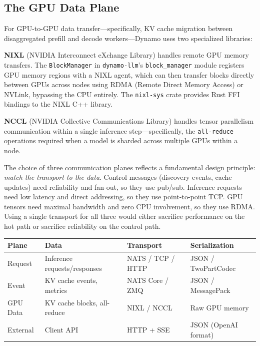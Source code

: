 \subsection{The GPU Data Plane}

For GPU-to-GPU data transfer---specifically, KV cache migration between disaggregated prefill and decode workers---Dynamo uses two specialized libraries:

%
\textbf{NIXL} (NVIDIA Interconnect eXchange Library) handles remote GPU memory transfers. The \texttt{BlockManager} in \texttt{dynamo-llm}'s \texttt{block\_manager} module registers GPU memory regions with a NIXL agent, which can then transfer blocks directly between GPUs across nodes using RDMA (Remote Direct Memory Access) or NVLink, bypassing the CPU entirely. The \texttt{nixl-sys} crate provides Rust FFI bindings to the NIXL C++ library.

\textbf{NCCL} (NVIDIA Collective Communications Library) handles tensor parallelism communication within a single inference step---specifically, the \texttt{all-reduce} operations required when a model is sharded across multiple GPUs within a node.

\begin{insightbox}
The choice of three communication planes reflects a fundamental design principle: \emph{match the transport to the data}. Control messages (discovery events, cache updates) need reliability and fan-out, so they use pub/sub. Inference requests need low latency and direct addressing, so they use point-to-point TCP. GPU tensors need maximal bandwidth and zero CPU involvement, so they use RDMA. Using a single transport for all three would either sacrifice performance on the hot path or sacrifice reliability on the control path.
\end{insightbox}

\begin{center}
\begin{tabular}{llll}
\toprule
\textbf{Plane} & \textbf{Data} & \textbf{Transport} & \textbf{Serialization} \\
\midrule
Request & Inference requests/responses & NATS / TCP / HTTP & JSON / TwoPartCodec \\
Event & KV cache events, metrics & NATS Core / ZMQ & JSON / MessagePack \\
GPU Data & KV cache blocks, all-reduce & NIXL / NCCL & Raw GPU memory \\
External & Client API & HTTP + SSE & JSON (OpenAI format) \\
\bottomrule
\end{tabular}
\end{center}

